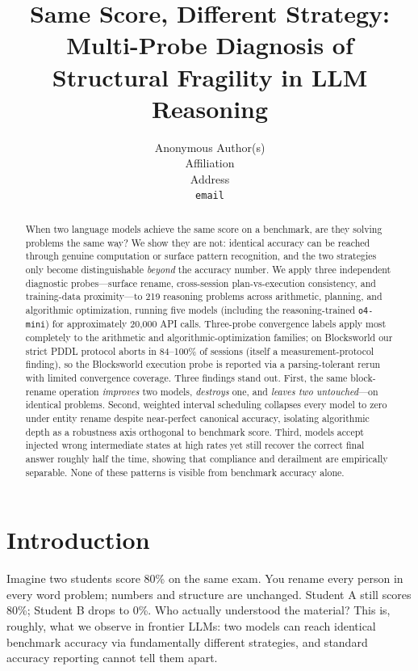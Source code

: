 \documentclass{article}
\title{Same Score, Different Strategy:\\Multi-Probe Diagnosis of Structural Fragility in LLM Reasoning}
\author{%
  Anonymous Author(s)\\
  Affiliation\\
  Address\\
  \texttt{email}
}
\newcommand{\omini}{\texttt{o4-mini}}     %
\begin{document}
\maketitle

\begin{abstract}
When two language models achieve the same score on a benchmark, are they
solving problems the same way? We show they are not: identical accuracy can
be reached through genuine computation or surface pattern recognition, and
the two strategies only become distinguishable \emph{beyond} the accuracy
number. We apply three independent diagnostic probes---surface rename,
cross-session plan-vs-execution consistency, and training-data
proximity---to 219 reasoning problems across arithmetic, planning, and
algorithmic optimization, running five models (including the
reasoning-trained \omini) for approximately 20{,}000 API calls. Three-probe
convergence labels apply most completely to the arithmetic and
algorithmic-optimization families; on Blocksworld our strict PDDL protocol
aborts in 84--100\% of sessions (itself a measurement-protocol finding), so
the Blocksworld execution probe is reported via a parsing-tolerant rerun with
limited convergence coverage. Three findings
stand out. First, the same block-rename operation \emph{improves} two
models, \emph{destroys} one, and \emph{leaves two untouched}---on identical
problems. Second, weighted interval scheduling collapses every model to zero
under entity rename despite near-perfect canonical accuracy, isolating
algorithmic depth as a robustness axis orthogonal to benchmark score. Third,
models accept injected wrong intermediate states at high rates yet still
recover the correct final answer roughly half the time, showing that
compliance and derailment are empirically separable. None of these patterns
is visible from benchmark accuracy alone.
\end{abstract}

\section{Introduction}
\label{sec:intro}

Imagine two students score 80\% on the same exam. You rename every person in
every word problem; numbers and structure are unchanged. Student A still
scores 80\%; Student B drops to 0\%. Who actually understood the material?
This is, roughly, what we observe in frontier LLMs: two models can reach
identical benchmark accuracy via fundamentally different strategies, and
standard accuracy reporting cannot tell them apart.
\end{document}
